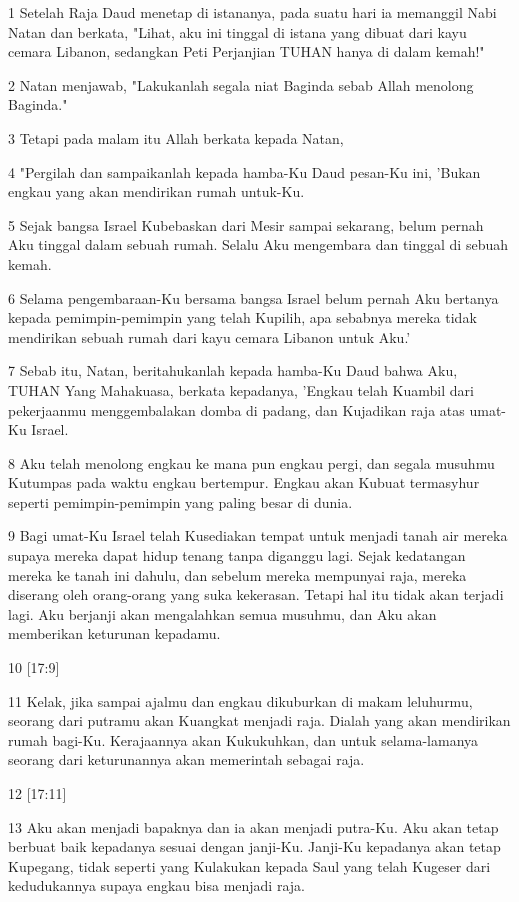 \par 1 Setelah Raja Daud menetap di istananya, pada suatu hari ia memanggil Nabi Natan dan berkata, "Lihat, aku ini tinggal di istana yang dibuat dari kayu cemara Libanon, sedangkan Peti Perjanjian TUHAN hanya di dalam kemah!"
\par 2 Natan menjawab, "Lakukanlah segala niat Baginda sebab Allah menolong Baginda."
\par 3 Tetapi pada malam itu Allah berkata kepada Natan,
\par 4 "Pergilah dan sampaikanlah kepada hamba-Ku Daud pesan-Ku ini, 'Bukan engkau yang akan mendirikan rumah untuk-Ku.
\par 5 Sejak bangsa Israel Kubebaskan dari Mesir sampai sekarang, belum pernah Aku tinggal dalam sebuah rumah. Selalu Aku mengembara dan tinggal di sebuah kemah.
\par 6 Selama pengembaraan-Ku bersama bangsa Israel belum pernah Aku bertanya kepada pemimpin-pemimpin yang telah Kupilih, apa sebabnya mereka tidak mendirikan sebuah rumah dari kayu cemara Libanon untuk Aku.'
\par 7 Sebab itu, Natan, beritahukanlah kepada hamba-Ku Daud bahwa Aku, TUHAN Yang Mahakuasa, berkata kepadanya, 'Engkau telah Kuambil dari pekerjaanmu menggembalakan domba di padang, dan Kujadikan raja atas umat-Ku Israel.
\par 8 Aku telah menolong engkau ke mana pun engkau pergi, dan segala musuhmu Kutumpas pada waktu engkau bertempur. Engkau akan Kubuat termasyhur seperti pemimpin-pemimpin yang paling besar di dunia.
\par 9 Bagi umat-Ku Israel telah Kusediakan tempat untuk menjadi tanah air mereka supaya mereka dapat hidup tenang tanpa diganggu lagi. Sejak kedatangan mereka ke tanah ini dahulu, dan sebelum mereka mempunyai raja, mereka diserang oleh orang-orang yang suka kekerasan. Tetapi hal itu tidak akan terjadi lagi. Aku berjanji akan mengalahkan semua musuhmu, dan Aku akan memberikan keturunan kepadamu.
\par 10 [17:9]
\par 11 Kelak, jika sampai ajalmu dan engkau dikuburkan di makam leluhurmu, seorang dari putramu akan Kuangkat menjadi raja. Dialah yang akan mendirikan rumah bagi-Ku. Kerajaannya akan Kukukuhkan, dan untuk selama-lamanya seorang dari keturunannya akan memerintah sebagai raja.
\par 12 [17:11]
\par 13 Aku akan menjadi bapaknya dan ia akan menjadi putra-Ku. Aku akan tetap berbuat baik kepadanya sesuai dengan janji-Ku. Janji-Ku kepadanya akan tetap Kupegang, tidak seperti yang Kulakukan kepada Saul yang telah Kugeser dari kedudukannya supaya engkau bisa menjadi raja.
